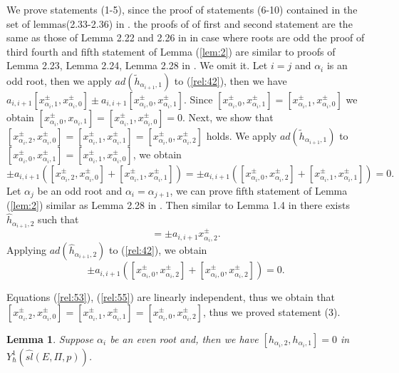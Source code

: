 \documentclass[english]{elsarticle}
\newtheorem{lemma}{Lemma}[section]
\numberwithin{equation}{section}
\begin{document}
We prove statements (1-5), since the proof of statements (6-10) contained in the set of lemmas(2.33-2.36) in \cite{Guaywork}. the proofs of of first and second statement are the same as those of Lemma 2.22 and 2.26 in \cite{Guaywork} in case where roots are odd the proof of third fourth and fifth statement of Lemma (\ref{lem:2}) are similar to proofs of Lemma 2.23, Lemma 2.24, Lemma 2.28 in \cite{Guaywork}. We omit it.
Let $i=j$ and $\alpha_i$ is an odd root, then we apply $ad(\tilde{h}_{\alpha_{i+1},1})$ to (\ref{rel:42}), then we have $a_{i,i+1}[x_{\alpha_i,1}^{\pm},x_{\alpha_i,0}^{\pm}]\pm a_{i,i+1}[x_{\alpha_i,0}^{\pm},x_{\alpha_i,1}^{\pm}]$. Since $[x_{\alpha_i,0}^{\pm},x_{\alpha_i,1}^{\pm}]=[x_{\alpha_i,1}^{\pm},x_{\alpha_i,0}^{\pm}]$ we obtain $[x_{\alpha_i,0}^{\pm},x_{\alpha_i,1}]=[x_{\alpha_i,1}^{\pm},x_{\alpha_i,0}^{\pm}]=0$. Next, we show that $[x_{\alpha_i,2}^{\pm},x_{\alpha_i,0}^{\pm}]=[x_{\alpha_i,1}^{\pm},x_{\alpha_i,1}^{\pm}]=[x_{\alpha_i,0}^{\pm},x_{\alpha_i,2}^{\pm}]$ holds. We apply $ad(\tilde{h}_{\alpha_{i+1},1})$ to $[x_{\alpha_i,0}^{\pm},x_{\alpha_i,1}^{\pm}]=[x_{\alpha_i,1}^{\pm},x_{\alpha_i,0}^{\pm}]$, we obtain
\begin{equation}
\label{rel:53}
    \pm a_{i,i+1}([x_{\alpha_i,2}^{\pm},x_{\alpha_i,0}^{\pm}]+[x_{\alpha_i,1}^{\pm},x_{\alpha_i,1}^{\pm}])=\pm a_{i,i+1}([x_{\alpha_i,0}^{\pm},x_{\alpha_i,2}^{\pm}]+[x_{\alpha_i,1}^{\pm},x_{\alpha_i,1}^{\pm}])=0.
\end{equation}
Let $\alpha_j$ be an odd root and $\alpha_i=\alpha_{j+1}$, we can prove fifth statement of Lemma (\ref{lem:2}) similar as Lemma 2.28 in \cite{Guaywork}. Then similar to Lemma 1.4 in \cite{Levendorski} there exists $\hat{h}_{\alpha_{i+1},2}$ such that
\begin{equation}
    [\hat{h}_{\alpha_{i+1},2},x_{\alpha_i,0}^{\pm}]=\pm a_{i,i+1}x_{\alpha_i,2}^{\pm}.
\end{equation}
Applying $ad(\hat{h}_{\alpha_{i+1},2})$ to (\ref{rel:42}), we obtain
\begin{equation}
\label{rel:55}
    \pm a_{i,i+1}([x_{\alpha_i,0}^{\pm},x_{\alpha_i,2}^{\pm}]+[x_{\alpha_i,0}^{\pm},x_{\alpha_i,2}^{\pm}]) = 0.
\end{equation}

Equations (\ref{rel:53}), (\ref{rel:55}) are linearly independent, thus we obtain that $[x_{\alpha_i,2}^{\pm},x_{\alpha_i,0}^{\pm}]=[x_{\alpha_i,1}^{\pm},x_{\alpha_i,1}^{\pm}]=[x_{\alpha_i,0}^{\pm},x_{\alpha_i,2}^{\pm}]$, thus we proved statement (3).

\begin{lemma}
\label{lem:3}
Suppose $\alpha_i$ be an even root and, then we have
$[h_{\alpha_i,2},h_{\alpha_i,1}]=0$ in $Y_{\hbar}^1(\hat{sl}(E,\Pi,p))$.\\
\end{lemma}
\end{document}
